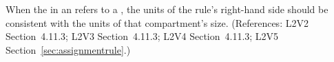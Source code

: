 When the  in an \AssignmentRule refers to a \Compartment,
the units of the rule's right-hand side should be consistent with the units
of that compartment's size.  (References: L2V2 Section~4.11.3;
L2V3 Section~4.11.3; L2V4 Section~4.11.3; L2V5 Section~\ref{sec:assignmentrule}.)

